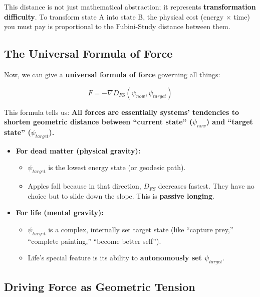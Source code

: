 This distance is not just mathematical abstraction; it represents \textbf{transformation difficulty}. To transform state A into state B, the physical cost (energy $\times$ time) you must pay is proportional to the Fubini-Study distance between them.

\subsection{The Universal Formula of Force}

Now, we can give a \textbf{universal formula of force} governing all things:

$$F = - \nabla D_{FS}(\psi_{now}, \psi_{target})$$

This formula tells us: \textbf{All forces are essentially systems' tendencies to shorten geometric distance between ``current state'' ($\psi_{now}$) and ``target state'' ($\psi_{target}$).}

\begin{itemize}
\item \textbf{For dead matter (physical gravity):}

    \begin{itemize}
    \item $\psi_{target}$ is the lowest energy state (or geodesic path).

    \item Apples fall because in that direction, $D_{FS}$ decreases fastest. They have no choice but to slide down the slope. This is \textbf{passive longing}.
    \end{itemize}

\item \textbf{For life (mental gravity):}

    \begin{itemize}
    \item $\psi_{target}$ is a complex, internally set target state (like ``capture prey,'' ``complete painting,'' ``become better self'').

    \item Life's special feature is its ability to \textbf{autonomously set $\psi_{target}$}.
    \end{itemize}
\end{itemize}

\subsection{Driving Force as Geometric Tension}

